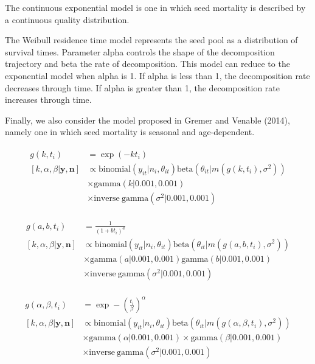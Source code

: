 \documentclass[12pt, oneside, titlepage]{article}   	%
\begin{document}
The continuous exponential model is one in which seed mortality is described by a continuous quality distribution. 

The Weibull residence time model represents the seed pool as a distribution of survival times. Parameter alpha controls the shape of the decomposition trajectory and beta the rate of decomposition. This model can reduce to the exponential model when alpha is 1. If alpha is less than 1, the decomposition rate decreases through time. If alpha is greater than 1, the decomposition rate increases through time. 

Finally, we also consider the model proposed in Gremer and Venable (2014), namely one in which seed mortality is seasonal and age-dependent. 

\begin{align}
  \begin{split}
  g(k,t_i) & = \exp(-k t_i) \\
[ k , \alpha, \beta | \bm{y}, \bm{n} ] & \propto \mathrm{binomial}(y_{it} | n_i, \theta_{it}) \mathrm{beta}(\theta _{it}| m(g(k, t_i ), \sigma^2) ) 
%
\\ & \times \mathrm{gamma}( k | 0.001, 0.001) 
\\ & \times \mathrm{inverse\ gamma}( \sigma^2 | 0.001, 0.001) 
  \end{split}
\end{align}

\begin{align}
  \begin{split}
  g(a,b,t_i) & = \frac{1}{(1+bt_i)^a}\\
[ k , \alpha, \beta | \bm{y}, \bm{n} ] & \propto \mathrm{binomial}(y_{it} | n_i, \theta_{it}) \mathrm{beta}(\theta _{it}| m(g(a,b, t_i ), \sigma^2) ) 
%
\\ & \times \mathrm{gamma}( a | 0.001, 0.001) \mathrm{gamma}( b | 0.001, 0.001) 
\\ & \times \mathrm{inverse\ gamma}( \sigma^2 | 0.001, 0.001) 
  \end{split}
\end{align}

\begin{align}
  \begin{split}
g(\alpha,\beta,t_i) & = \exp-(\frac{t_i}{\beta})^\alpha \\
[ k , \alpha, \beta | \bm{y}, \bm{n} ] & \propto \mathrm{binomial}(y_{it} | n_i, \theta_{it}) \mathrm{beta}(\theta _{it}| m(g(\alpha,\beta, t_i ) , \sigma^2) ) 
%
\\ & \times \mathrm{gamma}( \alpha | 0.001, 0.001) \times \mathrm{gamma}( \beta | 0.001, 0.001) 
\\ & \times \mathrm{inverse\ gamma}( \sigma^2 | 0.001, 0.001) 
%
  \end{split}
\end{align}
\end{document}
